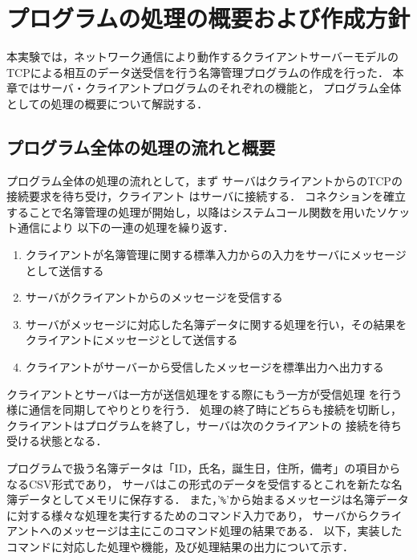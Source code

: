 

\section{プログラムの処理の概要および作成方針}
本実験では，ネットワーク通信により動作するクライアントサーバーモデルの
TCPによる相互のデータ送受信を行う名簿管理プログラムの作成を行った．
本章ではサーバ・クライアントプログラムのそれぞれの機能と，
プログラム全体としての処理の概要について解説する．

\subsection{プログラム全体の処理の流れと概要} \label{sec:prog-flow}
プログラム全体の処理の流れとして，まず
サーバはクライアントからのTCPの接続要求を待ち受け，クライアント
はサーバに接続する．
コネクションを確立することで名簿管理の処理が開始し，以降はシステムコール関数を用いたソケット通信により
以下の一連の処理を繰り返す．
\begin{enumerate}
  \item クライアントが名簿管理に関する標準入力からの入力をサーバにメッセージとして送信する
  \item サーバがクライアントからのメッセージを受信する
  \item サーバがメッセージに対応した名簿データに関する処理を行い，その結果をクライアントにメッセージとして送信する
  \item クライアントがサーバーから受信したメッセージを標準出力へ出力する
\end{enumerate}
クライアントとサーバは一方が送信処理をする際にもう一方が受信処理
を行う様に通信を同期してやりとりを行う．
処理の終了時にどちらも接続を切断し，
クライアントはプログラムを終了し，サーバは次のクライアントの
接続を待ち受ける状態となる．


プログラムで扱う名簿データは「ID，氏名，誕生日，住所，備考」の項目からなるCSV形式であり，
サーバはこの形式のデータを受信するとこれを新たな名簿データとしてメモリに保存する．
また，'\verb|%|'から始まるメッセージは名簿データに対する様々な処理を実行するためのコマンド入力であり，
サーバからクライアントへのメッセージは主にこのコマンド処理の結果である．
以下，実装したコマンドに対応した処理や機能，及び処理結果の出力について示す．

